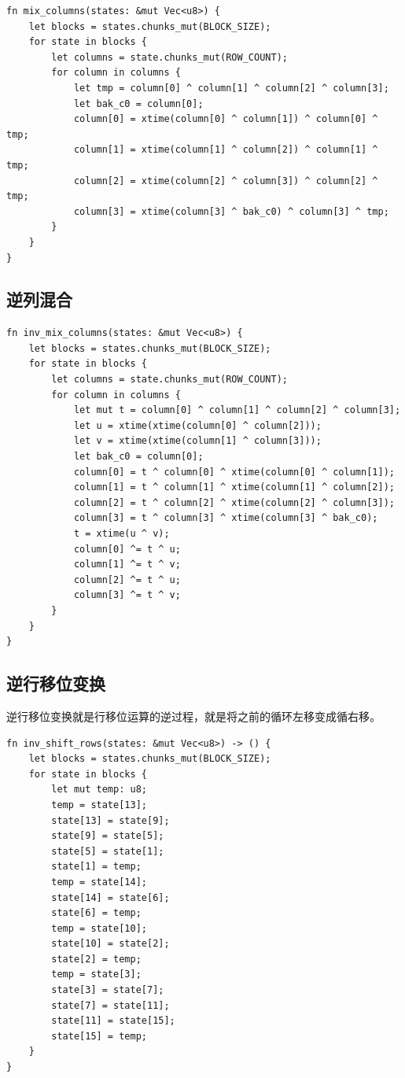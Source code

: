 \documentclass[degree=project,degree-type=project,cjk-font=noto]{thuthesis}
\begin{document}
  \begin{verbatim}
fn mix_columns(states: &mut Vec<u8>) {
    let blocks = states.chunks_mut(BLOCK_SIZE);
    for state in blocks {
        let columns = state.chunks_mut(ROW_COUNT);
        for column in columns {
            let tmp = column[0] ^ column[1] ^ column[2] ^ column[3];
            let bak_c0 = column[0];
            column[0] = xtime(column[0] ^ column[1]) ^ column[0] ^ tmp;
            column[1] = xtime(column[1] ^ column[2]) ^ column[1] ^ tmp;
            column[2] = xtime(column[2] ^ column[3]) ^ column[2] ^ tmp;
            column[3] = xtime(column[3] ^ bak_c0) ^ column[3] ^ tmp;
        }
    }
}
  \end{verbatim}


\subsection{逆列混合}

  \begin{verbatim}
fn inv_mix_columns(states: &mut Vec<u8>) {
    let blocks = states.chunks_mut(BLOCK_SIZE);
    for state in blocks {
        let columns = state.chunks_mut(ROW_COUNT);
        for column in columns {
            let mut t = column[0] ^ column[1] ^ column[2] ^ column[3];
            let u = xtime(xtime(column[0] ^ column[2]));
            let v = xtime(xtime(column[1] ^ column[3]));
            let bak_c0 = column[0];
            column[0] = t ^ column[0] ^ xtime(column[0] ^ column[1]);
            column[1] = t ^ column[1] ^ xtime(column[1] ^ column[2]);
            column[2] = t ^ column[2] ^ xtime(column[2] ^ column[3]);
            column[3] = t ^ column[3] ^ xtime(column[3] ^ bak_c0);
            t = xtime(u ^ v);
            column[0] ^= t ^ u;
            column[1] ^= t ^ v;
            column[2] ^= t ^ u;
            column[3] ^= t ^ v;
        }
    }
}
  \end{verbatim}


\subsection{逆行移位变换}

逆行移位变换就是行移位运算的逆过程，就是将之前的循环左移变成循右移。

  \begin{verbatim}
fn inv_shift_rows(states: &mut Vec<u8>) -> () {
    let blocks = states.chunks_mut(BLOCK_SIZE);
    for state in blocks {
        let mut temp: u8;
        temp = state[13];
        state[13] = state[9];
        state[9] = state[5];
        state[5] = state[1];
        state[1] = temp;
        temp = state[14];
        state[14] = state[6];
        state[6] = temp;
        temp = state[10];
        state[10] = state[2];
        state[2] = temp;
        temp = state[3];
        state[3] = state[7];
        state[7] = state[11];
        state[11] = state[15];
        state[15] = temp;
    }
}
  \end{verbatim}
\end{document}
